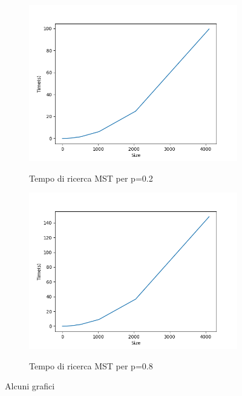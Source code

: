\documentclass[]{article}
\begin{document}
\begin{figure}[H]
    \centering
    \begin{subfigure}[b]{0.45\linewidth} 
        \centering
        \caption{Tempo di ricerca MST per p=0.2}
        \includegraphics[width=\textwidth]{krusk_time_p=02}
        \label{fig:krusk_time_p=02}
    \end{subfigure}
    \quad
    \begin{subfigure}[b]{0.45\linewidth}
        \centering
        \caption{Tempo di ricerca MST per p=0.8}
        \includegraphics[width=\textwidth]{krusk_time_p=08}
        \label{fig:krusk_time_p=08}
    \end{subfigure}
    \caption{Alcuni grafici}
    \label{fig:mst_time}
\end{figure}
\end{document}
